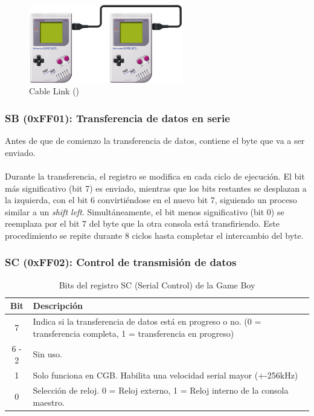 \begin{figure}[H]
    \centering
    \includegraphics[width=0.6\textwidth]{include/images/link_cable.png}
    \caption{Cable Link (\cite{linkcablewiki})}
    \label{figure:linkCable}
\end{figure}

\subsubsection{SB (0xFF01): Transferencia de datos en serie}

Antes de que de comienzo la transferencia de datos, contiene el byte que va a ser enviado.
\\\\
Durante la transferencia, el registro se modifica en cada ciclo de ejecución. El bit más significativo (bit 7) es enviado, mientras que los bits restantes se desplazan a la izquierda, con el bit 6 convirtiéndose en el nuevo bit 7, siguiendo un proceso similar a un \textit{shift left}. Simultáneamente, el bit menos significativo (bit 0) se reemplaza por el bit 7 del byte que la otra consola está transfiriendo. Este procedimiento se repite durante 8 ciclos hasta completar el intercambio del byte.

\subsubsection{SC (0xFF02): Control de transmisión de datos}

\begin{table}[h!]
    \centering
    \begin{tabular}{|c|p{10cm}|}
        \hline
        \textbf{Bit} & \textbf{Descripción} \\ \hline
        7 & Indica si la transferencia de datos está en progreso o no. (0 = transferencia completa, 1 = transferencia en progreso) \\ \hline
        6 - 2 & Sin uso. \\ \hline
        1 & Solo funciona en CGB. Habilita una velocidad serial mayor (+-256kHz) \\ \hline
        0 & Selección de reloj. 0 = Reloj externo, 1 = Reloj interno de la consola maestro. \\ \hline
    \end{tabular}
    \caption{Bits del registro SC (Serial Control) de la Game Boy}
\end{table}
    

